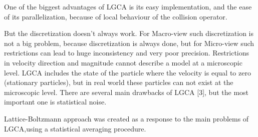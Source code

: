 One of the biggest advantages of LGCA is its easy implementation, and the ease
of its parallelization, because of local behaviour of the collision operator.

But the discretization doesn’t always work. For Macro-view such discretization is not a big problem, because discretization is always done, but for Micro-view such restrictions can lead to huge inconsistency and very poor precision. Restrictions in velocity direction and magnitude cannot describe a model at a microscopic level. LGCA includes the state of the particle where the velocity is equal to zero (stationary particles), but in real world these particles can not exist at the microscopic level. There are several main drawbacks of LGCA [3], but the most important one is statistical noise.

Lattice-Boltzmann approach was created as a response to the main problems of LGCA,using a statistical averaging procedure.
